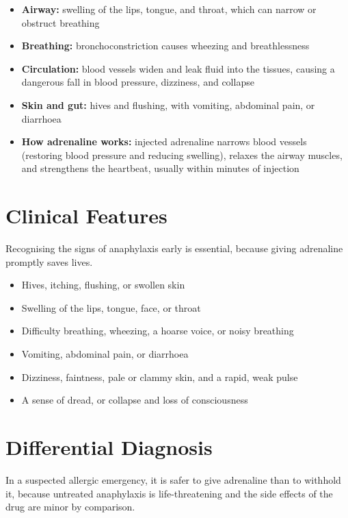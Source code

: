 \begin{itemize}
    \item \textbf{Airway:} swelling of the lips, tongue, and throat, which can narrow or obstruct breathing
    \item \textbf{Breathing:} bronchoconstriction causes wheezing and breathlessness
    \item \textbf{Circulation:} blood vessels widen and leak fluid into the tissues, causing a dangerous fall in blood pressure, dizziness, and collapse
    \item \textbf{Skin and gut:} hives and flushing, with vomiting, abdominal pain, or diarrhoea
    \item \textbf{How adrenaline works:} injected adrenaline narrows blood vessels (restoring blood pressure and reducing swelling), relaxes the airway muscles, and strengthens the heartbeat, usually within minutes of injection
\end{itemize}

\section*{Clinical Features}
Recognising the signs of anaphylaxis early is essential, because giving adrenaline promptly saves lives.

\begin{itemize}
    \item Hives, itching, flushing, or swollen skin
    \item Swelling of the lips, tongue, face, or throat
    \item Difficulty breathing, wheezing, a hoarse voice, or noisy breathing
    \item Vomiting, abdominal pain, or diarrhoea
    \item Dizziness, faintness, pale or clammy skin, and a rapid, weak pulse
    \item A sense of dread, or collapse and loss of consciousness
\end{itemize}

\section*{Differential Diagnosis}
In a suspected allergic emergency, it is safer to give adrenaline than to withhold it, because untreated anaphylaxis is life-threatening and the side effects of the drug are minor by comparison.

